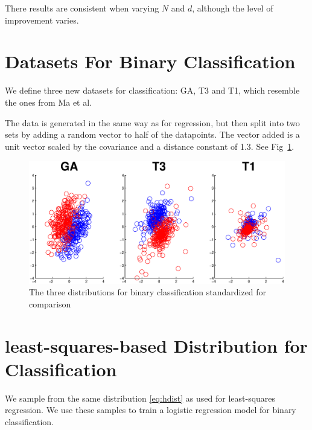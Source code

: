 \documentclass{article}
\begin{document}
There results are consistent when varying $N$ and $d$, although the level of improvement varies.
%
\section{Datasets For Binary Classification}
We define three new datasets for classification: GA, T3 and T1, which resemble the ones from Ma et al.

The data is generated in the same way as for regression, but then split into two sets by adding a random vector to half of the datapoints. The vector added is a unit vector scaled by the covariance and a distance constant of 1.3. See Fig~\ref{fig:datasetsClass}.

\begin{figure}[t]
\centering
\includegraphics[width=\linewidth]{images/Data_distributionsClass}
\caption{The three distributions for binary classification standardized for comparison}
\label{fig:datasetsClass}
\end{figure}

\section{least-squares-based Distribution for Classification}

We sample from the same distribution \eqref{eq:hdist} as used for least-squares regression. We use these samples to train a logistic regression model for binary classification.
 
\end{document}

